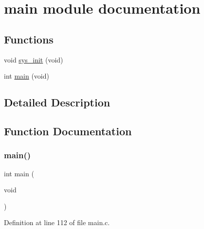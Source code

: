 \hypertarget{group__main__module}{}\section{main module documentation}
\label{group__main__module}
\subsection*{Functions}
\begin{DoxyCompactItemize}
\item 
void \hyperlink{group__main__module_gaf411a8bc6b7ed4b0af9114e10c959448}{sys\+\_\+init} (void)
\item 
int \hyperlink{group__main__module_ga840291bc02cba5474a4cb46a9b9566fe}{main} (void)
\end{DoxyCompactItemize}


\subsection{Detailed Description}


\subsection{Function Documentation}
\mbox{\label{group__main__module_ga840291bc02cba5474a4cb46a9b9566fe}} 
\subsubsection{\texorpdfstring{main()}{main()}}
{\footnotesize\ttfamily int main (\begin{DoxyParamCaption}\item[{void}]{ }\end{DoxyParamCaption})}



Definition at line 112 of file main.\+c.

